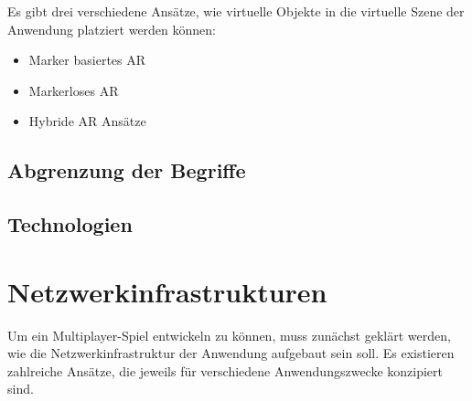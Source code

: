 Es gibt drei verschiedene Ansätze, wie virtuelle Objekte in die virtuelle Szene der Anwendung platziert werden können:
\begin{itemize}
    \item Marker basiertes \ac{AR}
    \item Markerloses \ac{AR}
    \item Hybride \ac{AR} Ansätze
\end{itemize}




\subsection{Abgrenzung der Begriffe}

\subsection{Technologien}

\section{Netzwerkinfrastrukturen}\label{sec:basics-network-structures}
Um ein Multiplayer-Spiel entwickeln zu können, muss zunächst geklärt werden, wie die Netzwerkinfrastruktur der Anwendung aufgebaut sein soll. Es existieren zahlreiche Ansätze, die jeweils für verschiedene Anwendungszwecke konzipiert sind.

